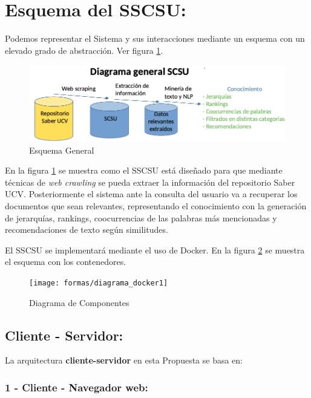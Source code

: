 \documentclass[
  10,
  spanish,
  openany]{book}
\begin{document}
\hypertarget{esquemas}{%
\section{Esquema del SSCSU:}\label{esquemas}}

Podemos representar el Sistema y sus interacciones mediante un esquema con un elevado grado de abstracción. Ver figura \ref{fig:esquema}.

\begin{figure}
\includegraphics[width=1\linewidth]{formas/diagramageneral} \caption{Esquema General}\label{fig:esquema}
\end{figure}

En la figura \ref{fig:esquema} se muestra como el SSCSU está diseñado para que mediante técnicas de \emph{web crawling} se pueda extraer la información del repositorio Saber UCV. Posteriormente el sistema ante la consulta del usuario va a recuperar los documentos que sean relevantes, representando el conocimiento con la generación de jerarquías, rankings, coocurrencias de las palabras más mencionadas y recomendaciones de texto según similitudes.

El SSCSU se implementará mediante el uso de Docker. En la figura \ref{fig:esquemadocker} se muestra el esquema con los contenedores.

\begin{figure}
\texttt{[image: formas/diagrama\_docker1]} \caption{Diagrama de Componentes}\label{fig:esquemadocker}
\end{figure}

\hypertarget{cliente---servidor}{%
\subsection{Cliente - Servidor:}\label{cliente---servidor}}

La arquitectura \textbf{cliente-servidor} en esta Propuesta se basa en:

\hypertarget{cliente---navegador-web}{%
\subsubsection{1 - Cliente - Navegador web:}\label{cliente---navegador-web}}
\end{document}
